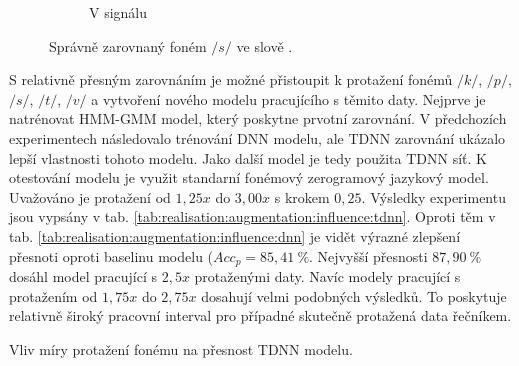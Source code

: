 \begin{figure}[htpb]
\begin{subfigure}[b]{0.55\textwidth}
    \caption{V signálu}
    \label{fig:realisation:augmentation:alignemnt:correct:audio}
  \end{subfigure}
  \caption{Správně zarovnaný foném $/s/$ ve slově .}
  \label{fig:realisation:augmentation:alignemnt:correct}
\end{figure}

S relativně přesným zarovnáním je možné přistoupit k protažení fonémů $/k/$, $/p/$, $/s/$, $/t/$, $/v/$ a vytvoření nového modelu pracujícího s těmito daty. Nejprve je natrénovat HMM-GMM model, který poskytne prvotní zarovnání. V předchozích experimentech následovalo trénování DNN modelu, ale TDNN zarovnání ukázalo lepší vlastnosti tohoto modelu. Jako další model je tedy použita TDNN síť. K otestování modelu je využit standarní fonémový zerogramový jazykový model. Uvažováno je protažení od $1,25x$ do $3,00x$ s krokem $0,25$. Výsledky experimentu jsou vypsány v tab. \ref{tab:realisation:augmentation:influence:tdnn}. Oproti těm v tab. \ref{tab:realisation:augmentation:influence:dnn} je vidět výrazné zlepšení přesnoti  oproti baselinu modelu ($Acc_{p} = 85,41\ \%$. Nejvyšší přesnosti $87,90\ \%$ dosáhl model pracující s $2,5x$ protaženými daty. Navíc modely pracující s protažením od $1,75x$ do $2,75x$ dosahují velmi podobných výsledků. To poskytuje relativně široký pracovní interval pro případné skutečně protažená data řečníkem.

\begin{table}[htpb]
  \centering
  \def\arraystretch{1.5}
  \caption{Vliv míry protažení fonému na přesnost TDNN modelu.}
  \label{tab:realisation:augmentation:influence:tdnn}
\end{table}

